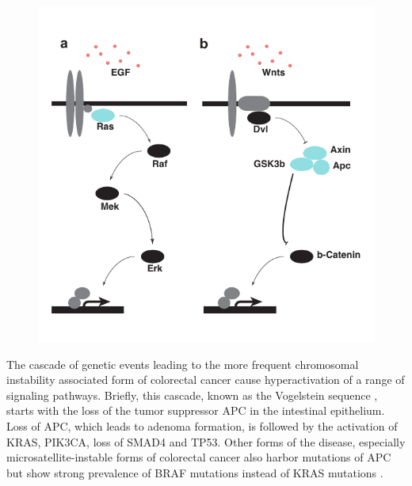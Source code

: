 \begin{flushleft}
\begin{figure}[h]
\centering
\includegraphics[width=\textwidth,
                height=\textheight,
                keepaspectratio]{figures/adenomaprofiling/pdf/fig_0_1.pdf}
\caption{}
\label{fig_180}
\end{figure}
\bigbreak


The cascade of genetic events leading to the more frequent chromosomal instability associated form of colorectal cancer cause hyperactivation of a range of signaling pathways. Briefly, this cascade, known as the Vogelstein sequence \cite{Cho1992}, starts with the loss of the tumor suppressor APC in the intestinal epithelium. Loss of APC, which leads to adenoma formation, is followed by the activation of KRAS, PIK3CA, loss of SMAD4 and TP53. Other forms of the disease, especially microsatellite-instable forms of colorectal cancer also harbor mutations of APC but show strong prevalence of BRAF mutations instead of KRAS mutations \cite{Guinney2015TheCancer.}. \par 


\end{flushleft}
